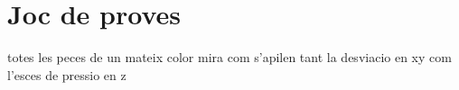 \section{Joc de proves}

totes les peces de un mateix color
mira com s'apilen tant la desviacio en xy com l'esces de pressio en z